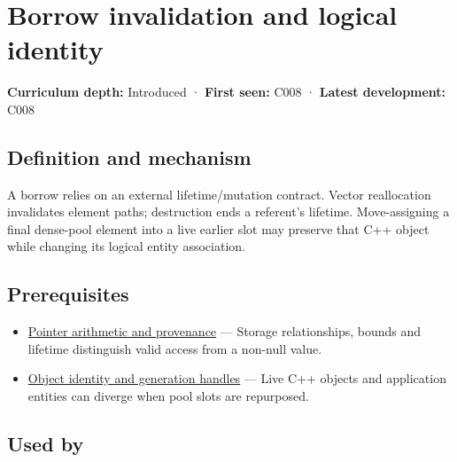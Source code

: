 \hypertarget{appendix-f9b8b9188c7f}{}\label{referencestart:appendix-f9b8b9188c7f}
\section{Borrow invalidation and logical identity}\label{appendix-f9b8b9188c7f-borrow-invalidation-and-logical-identity}

\hypertarget{appendix-f9b8b9188c7f-borrow-invalidation-and-logical-identity}{}

\textbf{Curriculum depth:} Introduced · \textbf{First seen:} C008 · \textbf{Latest development:} C008

\begin{allmightroledefinition}

\subsection{Definition and mechanism}\label{appendix-f9b8b9188c7f-definition-and-mechanism}

\hypertarget{appendix-f9b8b9188c7f-definition-and-mechanism}{}

A borrow relies on an external lifetime/mutation contract. Vector reallocation invalidates element paths; destruction ends a referent's lifetime. Move-assigning a final dense-pool element into a live earlier slot may preserve that C++ object while changing its logical entity association.

\end{allmightroledefinition}

\subsection{Prerequisites}\label{appendix-f9b8b9188c7f-prerequisites}

\hypertarget{appendix-f9b8b9188c7f-prerequisites}{}

\begin{itemize}
\tightlist
\item
  \hyperref[appendix-6af5921bc853]{Pointer arithmetic and provenance} --- Storage relationships, bounds and lifetime distinguish valid access from a non-null value.
\item
  \hyperref[appendix-f1581457d322]{Object identity and generation handles} --- Live C++ objects and application entities can diverge when pool slots are repurposed.
\end{itemize}

\subsection{Used by}\label{appendix-f9b8b9188c7f-used-by}

